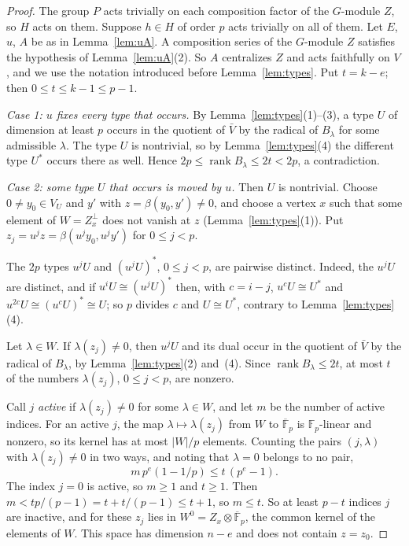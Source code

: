 \documentclass[11pt]{amsart}
\theoremstyle{definition}
\theoremstyle{remark}
\newcommand{\F}{\mathbb{F}}
\newcommand{\rank}{\operatorname{rank}}
\newcommand{\Kb}{\overline{\F}_p}
\begin{document}
\begin{proof}
The group $P$ acts trivially on each composition factor of the $G$-module $Z$, so $H$ acts on them. Suppose $h\in H$ of order $p$ acts trivially on all of them. Let $E$, $u$, $A$ be as in Lemma~\ref{lem:uA}. A composition series of the $G$-module $Z$ satisfies the hypothesis of Lemma~\ref{lem:uA}(2). So $A$ centralizes $Z$ and acts faithfully on $V$, and we use the notation introduced before Lemma~\ref{lem:types}. Put $t=k-e$; then $0\le t\le k-1\le p-1$.

\emph{Case 1: $u$ fixes every type that occurs.} By Lemma~\ref{lem:types}(1)--(3), a type $U$ of dimension at least $p$ occurs in the quotient of $\bar V$ by the radical of $B_\lambda$ for some admissible $\lambda$. The type $U$ is nontrivial, so by Lemma~\ref{lem:types}(4) the different type $U^*$ occurs there as well. Hence $2p\le\rank B_\lambda\le2t<2p$, a contradiction.

\emph{Case 2: some type $U$ that occurs is moved by $u$.} Then $U$ is nontrivial. Choose $0\ne y_0\in V_U$ and $y'$ with $z=\beta(y_0,y')\ne0$, and choose a vertex $x$ such that some element of $W=Z_x^\perp$ does not vanish at $z$ (Lemma~\ref{lem:types}(1)). Put $z_j=u^jz=\beta(u^jy_0,u^jy')$ for $0\le j<p$.

The $2p$ types $u^jU$ and $(u^jU)^*$, $0\le j<p$, are pairwise distinct. Indeed, the $u^jU$ are distinct, and if $u^iU\cong(u^jU)^*$ then, with $c=i-j$, $u^cU\cong U^*$ and $u^{2c}U\cong(u^cU)^*\cong U$; so $p$ divides $c$ and $U\cong U^*$, contrary to Lemma~\ref{lem:types}(4).

Let $\lambda\in W$. If $\lambda(z_j)\ne0$, then $u^jU$ and its dual occur in the quotient of $\bar V$ by the radical of $B_\lambda$, by Lemma~\ref{lem:types}(2) and~(4). Since $\rank B_\lambda\le2t$, at most $t$ of the numbers $\lambda(z_j)$, $0\le j<p$, are nonzero.

Call $j$ \emph{active} if $\lambda(z_j)\ne0$ for some $\lambda\in W$, and let $m$ be the number of active indices. For an active $j$, the map $\lambda\mapsto\lambda(z_j)$ from $W$ to $\Kb$ is $\F_p$-linear and nonzero, so its kernel has at most $|W|/p$ elements. Counting the pairs $(j,\lambda)$ with $\lambda(z_j)\ne0$ in two ways, and noting that $\lambda=0$ belongs to no pair,
\[
m\,p^e(1-1/p)\le t\,(p^e-1).
\]
The index $j=0$ is active, so $m\ge1$ and $t\ge1$. Then $m<tp/(p-1)=t+t/(p-1)\le t+1$, so $m\le t$. So at least $p-t$ indices $j$ are inactive, and for these $z_j$ lies in $W^0=Z_x\otimes\Kb$, the common kernel of the elements of $W$. This space has dimension $n-e$ and does not contain $z=z_0$.


\end{proof}
\end{document}
